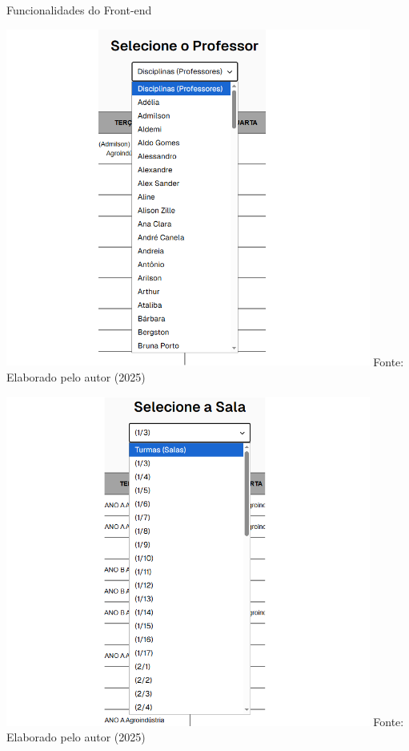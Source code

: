 \begin{frame}{Funcionalidades do Front-end}
  \begin{minipage}{0.48\textwidth}
    \centering
    \includegraphics[width=0.9\textwidth]{figuras/front-18.png}
    \small Fonte: Elaborado pelo autor (2025)
  \end{minipage}
  \hfill
  \begin{minipage}{0.48\textwidth}
    \centering
    \includegraphics[width=0.9\textwidth]{figuras/front-19.png}
    \small Fonte: Elaborado pelo autor (2025)
  \end{minipage}
\end{frame}

